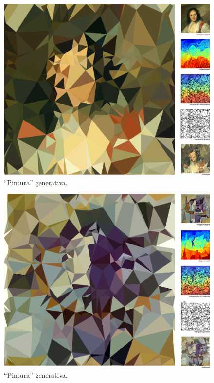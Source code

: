\begin{figure}[htb]
  \begin{center}
    \caption{``Pintura'' generativa.}
  \label{fig:posterA}
    \includegraphics[width=\textwidth]{figs/posterA}
    \fonteminha
  \end{center}
\end{figure}

\begin{figure}[htb]
  \begin{center}
    \caption{``Pintura'' generativa.}
  \label{fig:posterB}
    \includegraphics[width=\textwidth]{figs/posterB}
\fonteminha
  \end{center}
\end{figure}


